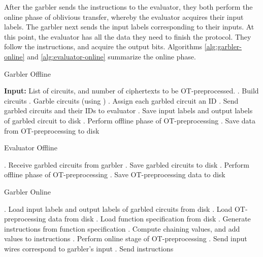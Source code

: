 After the garbler sends the instructions to the evaluator, they both perform the online phase of oblivious transfer, whereby the evaluator acquires their input labels. 
The garbler next sends the input labels corresponding to their inputs. 
At this point, the evaluator has all the data they need to finish the protocol. 
They follow the instructions, and acquire the output bits. 
Algorithms \ref{alg:garbler-online} and \ref{alg:evaluator-online} summarize the online phase. 

\begin{algorithm}
    \caption{Garbler Offline}
    \label{alg:garbler-offline}
    \begin{algorithmic}
        \State \textbf{Input:} List of circuits, and number of ciphertexts to be OT-preprocessed.
        . Build circuits
        . Garble circuits (using \LibGarble)
        . Assign each garbled circuit an ID
        . Send garbled circuits and their IDs to evaluator
        . Save input labels and output labels of garbled circuit to disk
        . Perform offline phase of OT-preprocessing
        . Save data from OT-preprocessing to disk
    \end{algorithmic}
\end{algorithm}

\begin{algorithm}
    \caption{Evaluator Offline}
    \label{alg:evaluator-offline}
    \begin{algorithmic}
        . Receive garbled circuits from garbler
        . Save garbled circuits to disk
        . Perform offline phase of OT-preprocessing
        . Save OT-preprocessing data to disk
    \end{algorithmic}
\end{algorithm}

\begin{algorithm}
    \caption{Garbler Online}
    \label{alg:garbler-online}
    \begin{algorithmic}
        . Load input labels and output labels of garbled circuits from disk
        . Load OT-preprocessing data from disk
        . Load function specification from disk
        . Generate instructions from function specification
        . Compute chaining values, and add values to instructions
        . Perform online stage of OT-preprocessing
        . Send input wires correspond to garbler's input
        . Send instructions
    \end{algorithmic}
\end{algorithm}

